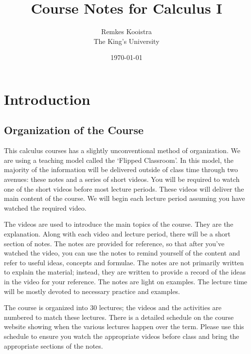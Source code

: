 \documentclass[fleqn]{report}
\begin{document}
\title{Course Notes for Calculus I}
\author{Remkes Kooistra \\
	The King's University}
\date{\today}	

\maketitle

\setcounter{tocdepth}{1}
\tableofcontents
{}

\chapter{Introduction}
\label{introduction}

\section{Organization of the Course}
\label{organization}

This calculus courses has a slightly unconventional method of
organization. We are using a teaching model
called the `Flipped Classroom'. In this model, the majority of the
information will be delivered outside of class time through
two avenues: these notes and a series of short videos.
You will be required to watch one of the short videos 
before most lecture periods. These videos will deliver the
main content of the course. We will begin each
lecture period assuming you have watched the required video.

The videos are used to introduce the main topics of the
course. They are the explanation. Along with each video and
lecture period, there will be a short section of notes. The
notes are provided for reference, so that after you've watched
the video, you can use the notes to remind yourself of the
content and refer to useful ideas, concepts and formulae. The
notes are not primarily written to explain the material;
instead, they are written to provide a record of the ideas in
the video for your reference. The notes are light on
examples. The lecture time will be mostly devoted to
necessary practice and examples.

The course is organized into 30 lectures; the videos and the
activities are numbered to match these lectures. There is a
detailed schedule on the course website showing when the
various lectures happen over the term. Please use this
schedule to ensure you watch the appropriate videos before
class and bring the appropriate sections of the notes.
\end{document}

